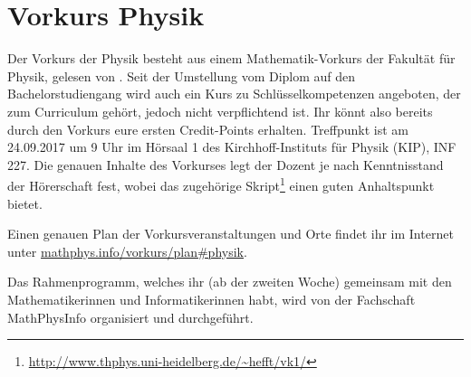 \section{Vorkurs Physik}
Der Vorkurs der Physik besteht aus einem Mathematik-Vorkurs der Fakultät für Physik, gelesen von \dozentvorkurs. Seit der Umstellung vom Diplom auf den Bachelorstudiengang wird auch ein Kurs zu Schlüsselkompetenzen angeboten, der zum Curriculum gehört, jedoch nicht verpflichtend ist. Ihr könnt also bereits durch den Vorkurs eure ersten Credit-Points erhalten. Treffpunkt ist am 24.09.2017 um 9 Uhr im Hörsaal 1 des Kirchhoff-Instituts für Physik (KIP), \Gls{INF} 227. Die genauen Inhalte des Vorkurses legt der Dozent je nach Kenntnisstand der Hörerschaft fest, wobei das zugehörige Skript\footnote{\url{http://www.thphys.uni-heidelberg.de/~hefft/vk1/}} einen guten Anhaltspunkt bietet.

Einen genauen Plan der Vorkursveranstaltungen und Orte findet ihr im Internet  unter \url{mathphys.info/vorkurs/plan\#physik}.

Das Rahmenprogramm, welches ihr (ab der zweiten Woche) gemeinsam mit den Mathematikerinnen und Informatikerinnen habt, wird von der Fachschaft MathPhysInfo organisiert und durchgeführt.

